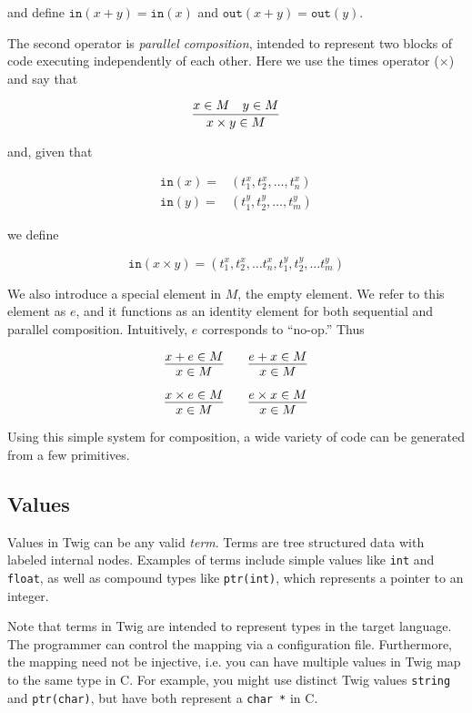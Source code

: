 and define $\mathtt{in}(x+y) = \mathtt{in}(x)$ and $\mathtt{out}(x+y) =
\mathtt{out}(y)$.

The second operator is \emph{parallel composition}, intended to represent two
blocks of code executing independently of each other. Here we use the times
operator ($\times$) and say that

\[
\infer
{x \times y \in M}
{x \in M \quad y \in M}
\]

and, given that 

\begin{eqnarray*}
\mathtt{in}(x) =& (t^x_1,t^x_2,\hdots,t^x_n)\\
\mathtt{in}(y) =& (t^y_1,t^y_2,\hdots,t^y_m)
\end{eqnarray*}

we define

\[
\mathtt{in}(x \times y) = 
(t^x_1,t^x_2, \hdots t^x_n,t^y_1,t^y_2, \hdots t^y_m)
\]

We also introduce a special element in $M$, the empty element. We refer to
this element as $e$, and it functions as an identity element for both
sequential and parallel composition. Intuitively, $e$ corresponds to
``no-op.'' Thus

\[
\infer{x \in M}{x + e \in M} \qquad \infer{x \in M}{e + x \in M}
\]

\[
\infer{x \in M}{x \times e \in M} \qquad \infer{x \in M}{e \times x \in M}
\]

Using this simple system for composition, a wide variety of code can be
generated from a few primitives.

\subsection{Values}

Values in Twig can be any valid \emph{term}. Terms are tree structured data
with labeled internal nodes. Examples of terms include simple values like
\texttt{int} and \texttt{float}, as well as compound types like
\texttt{ptr(int)}, which represents a pointer to an integer.

Note that terms in Twig are intended to represent types in the target
language. The programmer can control the mapping via a configuration file.
Furthermore, the mapping need not be injective, i.e. you can have multiple
values in Twig map to the same type in C. For example, you might use distinct
Twig values \texttt{string} and \texttt{ptr(char)}, but have both represent a
\texttt{char *} in C.

